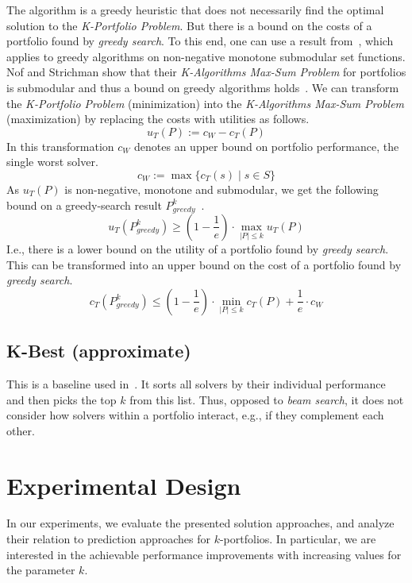 \documentclass[conference]{IEEEtran}
\begin{document}
The algorithm is a greedy heuristic that does not necessarily find the optimal solution to the \emph{K-Portfolio Problem}. 
But there is a bound on the costs of a portfolio found by \emph{greedy search}. 
To this end, one can use a result from~\cite{nemhauser1978analysis}, which applies to greedy algorithms on non-negative monotone submodular set functions.
Nof and Strichman show that their \emph{K-Algorithms Max-Sum Problem} for portfolios is submodular and thus a bound on greedy algorithms holds~\cite{nof2020real}. 
We can transform the \emph{K-Portfolio Problem} (minimization) into the \emph{K-Algorithms Max-Sum Problem} (maximization) by replacing the costs with utilities as follows.%
$$
u_{T}(P) := c_W - c_{T}(P)
$$
In this transformation $c_W$ denotes an upper bound on portfolio performance, the single worst solver.%
$$
c_W := \max\{c_T(s) \mid s \in S\}
$$
As $u_{T}(P)$ is non-negative, monotone and submodular, we get the following bound on a greedy-search result $P_{greedy}^k$~\cite{nemhauser1978analysis, krause2014submodular}.%
$$
	u_{T}(P_{greedy}^k) \geq (1 - \frac{1}{e}) \cdot \max_{|P| \leq k}{u_{T}(P)}
$$
I.e., there is a lower bound on the utility of a portfolio found by \emph{greedy search}.
This can be transformed into an upper bound on the cost of a portfolio found by \emph{greedy search}.%
\begin{equation}
	c_{T}(P_{greedy}^k) \leq (1 - \frac{1}{e}) \cdot \min_{|P| \leq k}{c_{T}(P)} + \frac{1}{e} \cdot c_W
	\label{eq:upper-bound}
\end{equation}

\subsection{K-Best (approximate)}

This is a baseline used in~\cite{nof2020real}.
It sorts all solvers by their individual performance and then picks the top $k$ from this list.
Thus, opposed to \emph{beam search}, it does not consider how solvers within a portfolio interact, e.g., if they complement each other.

\section{Experimental Design}
\label{sec:experimental-design}

In our experiments, we evaluate the presented solution approaches, and analyze their relation to prediction approaches for $k$-portfolios. 
In particular, we are interested in the achievable performance improvements with increasing values for the parameter $k$. 
\end{document}
